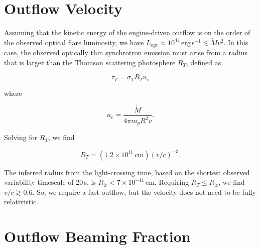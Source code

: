 \documentclass{nature_plusfigure}
\begin{document}
\begin{methods}


\section{Outflow Velocity}
\label{sec:outflow-velocity}

Assuming that the kinetic energy of the engine-driven outflow is on the order of the observed optical flare luminosity, we have $L_\mathrm{opt} \approx 10^{44}\,$erg\,s$^{-1} \lesssim \dot{M}v^2$. In this case, the observed optically thin synchrotron emission must arise from a radius that is larger than the Thomson scattering photosphere $R_T$, defined as

\begin{equation}
    \tau_T = \sigma_T R_T n_e
\end{equation}

\noindent where 

\begin{equation}
    n_e = \frac{\dot{M}}{4\pi m_p R^2 v}.
\end{equation}

\noindent Solving for $R_T$, we find

\begin{equation}
    R_T = (1.2 \times 10^{11}\,\mathrm{cm}) (v/c)^{-3}.
\end{equation}

The inferred radius from the light-crossing time, based on the shortest observed variability timescale of 20\,s, is $R_\mathrm{lc} < 7\times10^{-11}\,$cm. Requiring $R_T \leq R_\mathrm{lc}$, we find $v/c \gtrsim 0.6$. So, we require a fast outflow, but the velocity does not need to be fully relativistic. 

\section{Outflow Beaming Fraction}
\label{sec:beaming-fraction}


\end{methods}
\end{document}
